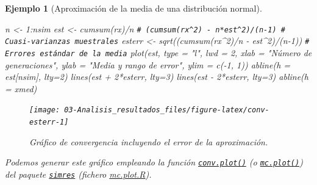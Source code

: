 \documentclass[
]{book}
\newenvironment{Shaded}{\begin{snugshade}}{\end{snugshade}}
\newcommand{\AttributeTok}[1]{\textcolor[rgb]{0.77,0.63,0.00}{#1}}
\newcommand{\CommentTok}[1]{\textcolor[rgb]{0.56,0.35,0.01}{\textit{#1}}}
\newcommand{\DecValTok}[1]{\textcolor[rgb]{0.00,0.00,0.81}{#1}}
\newcommand{\FunctionTok}[1]{\textcolor[rgb]{0.00,0.00,0.00}{#1}}
\newcommand{\NormalTok}[1]{#1}
\newcommand{\OtherTok}[1]{\textcolor[rgb]{0.56,0.35,0.01}{#1}}
\newcommand{\SpecialCharTok}[1]{\textcolor[rgb]{0.00,0.00,0.00}{#1}}
\newcommand{\StringTok}[1]{\textcolor[rgb]{0.31,0.60,0.02}{#1}}
\theoremstyle{break}
\newtheorem{example}{Ejemplo}[chapter]
\theoremstyle{nonumberplain}
\renewcommand{\CommentTok}[1]{\textcolor[rgb]{0.41,0.41,0.41}{\texttt{#1}}}
\begin{document}
\begin{example}[Aproximación de la media de una distribución normal]
\begin{Shaded}
\begin{Highlighting}[]
\NormalTok{n }\OtherTok{\textless{}{-}} \DecValTok{1}\SpecialCharTok{:}\NormalTok{nsim}
\NormalTok{est }\OtherTok{\textless{}{-}} \FunctionTok{cumsum}\NormalTok{(rx)}\SpecialCharTok{/}\NormalTok{n}
\CommentTok{\# (cumsum(rx\^{}2) {-} n*est\^{}2)/(n{-}1) \# Cuasi{-}varianzas muestrales}
\NormalTok{esterr }\OtherTok{\textless{}{-}} \FunctionTok{sqrt}\NormalTok{((}\FunctionTok{cumsum}\NormalTok{(rx}\SpecialCharTok{\^{}}\DecValTok{2}\NormalTok{)}\SpecialCharTok{/}\NormalTok{n }\SpecialCharTok{{-}}\NormalTok{ est}\SpecialCharTok{\^{}}\DecValTok{2}\NormalTok{)}\SpecialCharTok{/}\NormalTok{(n}\DecValTok{{-}1}\NormalTok{)) }\CommentTok{\# Errores estándar de la media}
\FunctionTok{plot}\NormalTok{(est, }\AttributeTok{type =} \StringTok{"l"}\NormalTok{, }\AttributeTok{lwd =} \DecValTok{2}\NormalTok{, }\AttributeTok{xlab =} \StringTok{"Número de generaciones"}\NormalTok{, }
     \AttributeTok{ylab =} \StringTok{"Media y rango de error"}\NormalTok{, }\AttributeTok{ylim =} \FunctionTok{c}\NormalTok{(}\SpecialCharTok{{-}}\DecValTok{1}\NormalTok{, }\DecValTok{1}\NormalTok{))}
\FunctionTok{abline}\NormalTok{(}\AttributeTok{h =}\NormalTok{ est[nsim], }\AttributeTok{lty=}\DecValTok{2}\NormalTok{)}
\FunctionTok{lines}\NormalTok{(est }\SpecialCharTok{+} \DecValTok{2}\SpecialCharTok{*}\NormalTok{esterr, }\AttributeTok{lty=}\DecValTok{3}\NormalTok{)}
\FunctionTok{lines}\NormalTok{(est }\SpecialCharTok{{-}} \DecValTok{2}\SpecialCharTok{*}\NormalTok{esterr, }\AttributeTok{lty=}\DecValTok{3}\NormalTok{)}
\FunctionTok{abline}\NormalTok{(}\AttributeTok{h =}\NormalTok{ xmed)}
\end{Highlighting}
\end{Shaded}

\begin{figure}[!htb]

{\centering \texttt{[image: 03-Analisis\_resultados\_files/figure-latex/conv-esterr-1]} 

}

\caption{Gráfico de convergencia incluyendo el error de la aproximación.}\label{fig:conv-esterr}
\end{figure}

Podemos generar este gráfico empleando la función \href{https://rubenfcasal.github.io/simres/reference/mc.plot.html}{\texttt{conv.plot()}} (o \href{https://rubenfcasal.github.io/simres/reference/mc.plot.html}{\texttt{mc.plot()}}) del paquete \href{https://rubenfcasal.github.io/simres}{\texttt{simres}} (fichero \href{R/mc.plot.R}{\emph{mc.plot.R}}).
\end{example}
\end{document}
